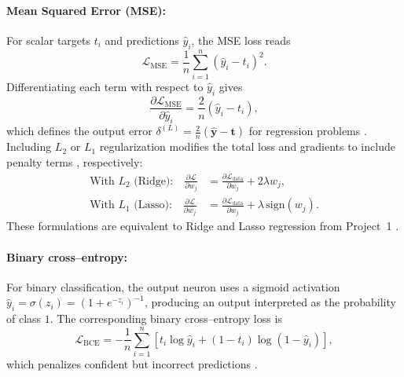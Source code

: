 \documentclass[amssymb,twocolumn,aps]{revtex4}
\begin{document}
\paragraph{Mean Squared Error (MSE):}
For scalar targets $t_i$ and predictions $\hat{y}_i$, the MSE loss reads
\begin{equation}
\label{MSE loss}
\mathcal{L}_{\mathrm{MSE}} =
\frac{1}{n}\sum_{i=1}^{n}(\hat{y}_i - t_i)^2.
\end{equation}
Differentiating each term with respect to $\hat{y}_i$ gives
\begin{equation}
\frac{\partial \mathcal{L}_{\mathrm{MSE}}}{\partial \hat{y}_i}
= \frac{2}{n}(\hat{y}_i - t_i),
\end{equation}
which defines the output error
$\delta^{(L)} = \frac{2}{n}(\hat{\mathbf{y}} - \mathbf{t})$ for regression problems
\cite{deisenroth2020}. Including $L_2$ or $L_1$ regularization modifies the
total loss and gradients to include penalty terms
\cite{hastie2025}, respectively:
\begin{align}
\text{With } L_2 \text{ (Ridge):}\quad
\frac{\partial \mathcal{L}}{\partial w_j}
&= \frac{\partial \mathcal{L}_{\text{data}}}{\partial w_j} + 2\lambda w_j,\\[6pt]
\text{With } L_1 \text{ (Lasso):} \quad
\frac{\partial \mathcal{L}}{\partial w_j}
&= \frac{\partial \mathcal{L}_{\text{data}}}{\partial w_j} + \lambda\,\mathrm{sign}(w_j).
\end{align}
These formulations are equivalent to Ridge and Lasso regression
from Project~1 \cite{hastie2025,deisenroth2020}.

\medskip
\paragraph{Binary cross--entropy:}
For binary classification, the output neuron uses a sigmoid activation
$\hat{y}_i=\sigma(z_i)=(1+e^{-z_i})^{-1}$, producing an output interpreted as the
probability of class $1$. The corresponding binary cross--entropy loss is
\begin{equation}
\label{eq:bce_loss}
\mathcal{L}_{\mathrm{BCE}}
= -\frac{1}{n}\sum_{i=1}^{n}
\left[t_i\log \hat{y}_i + (1-t_i)\log(1-\hat{y}_i)\right],
\end{equation}
which penalizes confident but incorrect predictions
\cite{goodfellow2016,deisenroth2020,hastie2025}.
\end{document}
